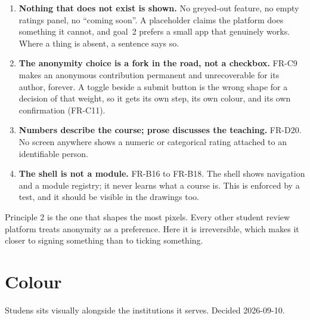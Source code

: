\documentclass[11pt,a4paper]{article}
\begin{document}
\begin{enumerate}[leftmargin=*,itemsep=2mm]
\item \textbf{Nothing that does not exist is shown.} No greyed-out feature, no
  empty ratings panel, no ``coming soon''. A placeholder claims the platform
  does something it cannot, and goal~2 prefers a small app that genuinely
  works. Where a thing is absent, a sentence says so.

\item \textbf{The anonymity choice is a fork in the road, not a checkbox.}
  FR-C9 makes an anonymous contribution permanent and unrecoverable for its
  author, forever. A toggle beside a submit button is the wrong shape for a
  decision of that weight, so it gets its own step, its own colour, and its own
  confirmation (FR-C11).

\item \textbf{Numbers describe the course; prose discusses the teaching.}
  FR-D20. No screen anywhere shows a numeric or categorical rating attached to
  an identifiable person.

\item \textbf{The shell is not a module.} FR-B16 to FR-B18. The shell shows
  navigation and a module registry; it never learns what a course is. This is
  enforced by a test, and it should be visible in the drawings too.
\end{enumerate}

\begin{why}
Principle 2 is the one that shapes the most pixels. Every other student review
platform treats anonymity as a preference. Here it is irreversible, which makes
it closer to signing something than to ticking something.
\end{why}

\section{Colour}

Studens sits visually alongside the institutions it serves. Decided
2026-09-10.
\end{document}
